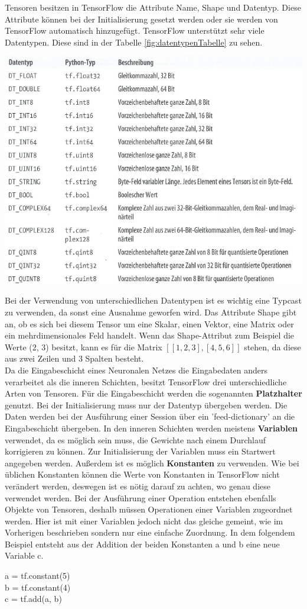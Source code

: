 Tensoren besitzen in TensorFlow die Attribute Name, Shape und Datentyp. Diese Attribute können bei der Initialisierung gesetzt werden oder sie werden von TensorFlow automatisch hinzugefügt. TensorFlow unterstützt sehr viele Datentypen. Diese sind in der Tabelle \ref{fig:datentypenTabelle} zu sehen.\\
\begin{center}
\includegraphics[width=.6\textwidth]{../abbildungen/Tabelle3-2.pdf}
	\label{fig:datentypenTabelle}
\end{center}
Bei der Verwendung von unterschiedlichen Datentypen ist es wichtig eine Typcast zu verwenden, da sonst eine Ausnahme geworfen wird. Das Attribute Shape gibt an, ob es sich bei diesem Tensor um eine Skalar, einen Vektor, eine Matrix oder ein mehrdimensionales Feld handelt. Wenn das Shape-Attribut zum Beispiel die Werte (2, 3) besitzt, kann es für die Matrix $\mathit{[[1, 2, 3], [4, 5, 6]]}$ stehen, da diese aus zwei Zeilen und 3 Spalten besteht.\\
Da die Eingabeschicht eines Neuronalen Netzes die Eingabedaten anders verarbeitet als die inneren Schichten, besitzt TensorFlow drei unterschiedliche Arten von Tensoren. Für die Eingabeschicht werden die sogenannten \textbf{Platzhalter} genutzt. Bei der Initialisierung muss nur der Datentyp übergeben werden. Die Daten werden bei der Ausführung einer Session über ein 'feed-dictionary'  an die Eingabeschicht übergeben. In den inneren Schichten werden meistens \textbf{Variablen} verwendet, da es möglich sein muss, die Gewichte nach einem Durchlauf korrigieren zu können. Zur Initialisierung der Variablen muss ein Startwert angegeben werden. Außerdem ist es möglich \textbf{Konstanten} zu verwenden. Wie bei üblichen Konstanten können die Werte von Konstanten in TensorFlow nicht verändert werden, deswegen ist es nötig darauf zu achten, wo genau diese verwendet werden.
Bei der Ausführung einer Operation entstehen ebenfalls Objekte von Tensoren, deshalb müssen Operationen einer Variablen zugeordnet werden. Hier ist mit einer Variablen jedoch nicht das gleiche gemeint, wie im Vorherigen beschrieben sondern nur eine einfache Zuordnung. In dem folgendem Beispiel entsteht aus der Addition der beiden Konstanten a und b eine neue Variable c.
\begin{center}
a = tf.constant(5)\\ b = tf.constant(4)\\ c = tf.add(a, b)    
\end{center}

